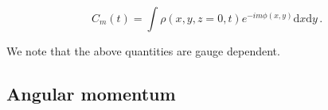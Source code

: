 \begin{equation}
\label{eq:modes}
C_m(t) = \int \rho(x,y,z=0,t) e^{-i m \phi(x,y)} \text{d}x \text{d} y \, .
\end{equation}

%
We note that the above quantities are gauge dependent.
%
%






\subsection{Angular momentum} \label{sec:bns_sims:method:ang_mom}



%

